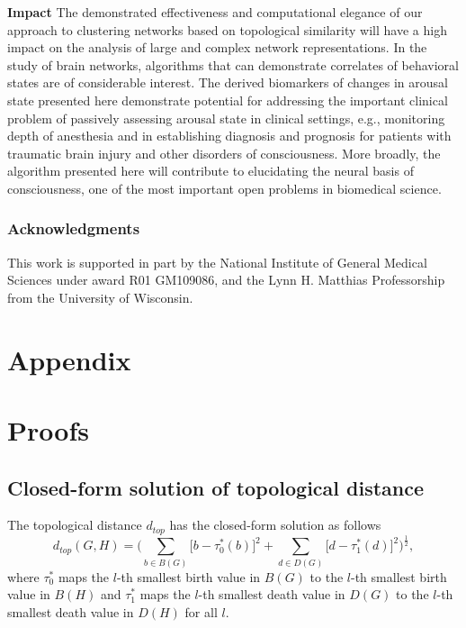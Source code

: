 \documentclass{article} %
\begin{document}
\textbf{Impact}
\label{sec:discussion}
The demonstrated effectiveness and computational elegance of our approach to clustering networks based on topological similarity will have a high impact on the analysis of large and complex network representations. In the study of brain networks,
algorithms that can demonstrate correlates of behavioral states are of considerable interest. The derived biomarkers of changes in arousal state presented here demonstrate potential for addressing the important clinical problem of passively assessing arousal state in clinical settings, e.g., monitoring depth of anesthesia and in establishing diagnosis and prognosis for patients with traumatic brain injury and other disorders of consciousness. More broadly, the algorithm presented here will contribute to elucidating the neural basis of consciousness, one of the most important open problems in biomedical science.


\subsubsection*{Acknowledgments}
This work is supported in part by the National Institute of General Medical Sciences under award R01 GM109086, and the Lynn H. Matthias Professorship from the University of Wisconsin.







\appendix

\captionsetup[table]{name=Supplementary Table}
\captionsetup[figure]{name=Supplementary Figure}
\setcounter{figure}{0}
\setcounter{lemma}{0}
\setcounter{theorem}{0}

\section*{Appendix}



\section{Proofs}
\label{supp:proof}


\subsection{Closed-form solution of topological distance}

The topological distance $d_{top}$ has the closed-form solution as follows
\[ d_{top}(G,H) = \Big( \sum_{b \in B(G)} \big[ b - \tau_0^*(b)\big]^2 + \sum_{d \in D(G)} \big[ d - \tau_1^*(d)\big]^2 \Big)^\frac{1}{2},
\]
where $\tau_0^*$ maps the $l$-th smallest birth value in $B(G)$ to the $l$-th smallest birth value in $B(H)$ and $\tau_1^*$ maps the $l$-th smallest death value in $D(G)$ to the $l$-th smallest death value in $D(H)$ for all $l$.
\end{document}
